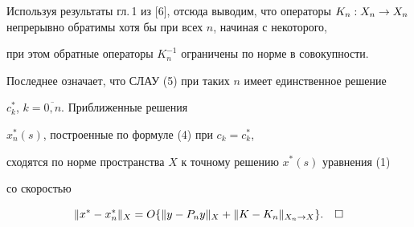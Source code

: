 Используя результаты гл.\,1 из [6], отсюда выводим, что операторы $\operator{K_n}


{X_n}{X_n}$ непрерывно обратимы хотя бы при всех $n$, начиная с некоторого,


при этом обратные операторы $K_n^{-1}$ ограничены по норме в совокупности.


Последнее означает, что СЛАУ (5) при таких $n$ имеет единственное решение


$c_k^*$, $k=\overline{0,n}$. Приближенные решения


$x_n^*(s)$, построенные по формуле (4) при $c_k=c_k^*$,


сходятся по норме пространства $X$ к точному решению $x^*(s)$ уравнения (1)


со скоростью


$$


\|x^*-x_n^*\|_\X =O\{ \|y-P_ny\|_\X +\|K-K_n\|_\XnX\}.\quad\square


$$








